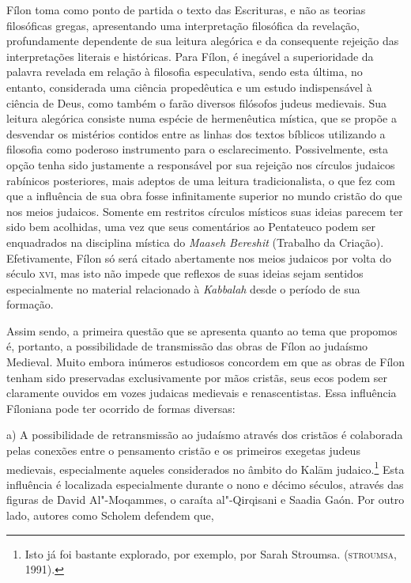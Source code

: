 Fílon toma como ponto de partida o texto das Escrituras, e não as
teorias filosóficas gregas, apresentando uma interpretação filosófica
da revelação, profundamente dependente de sua leitura alegórica e da
consequente rejeição das interpretações literais e históricas. Para
Fílon, é inegável a superioridade da palavra revelada em relação à
filosofia especulativa, sendo esta última, no entanto, considerada
uma ciência propedêutica e um estudo indispensável à ciência de Deus,
como também o farão diversos filósofos judeus medievais. Sua leitura
alegórica consiste numa espécie de hermenêutica mística, que se
propõe a desvendar os mistérios contidos entre as linhas dos textos
bíblicos utilizando a filosofia como poderoso instrumento para o
esclarecimento. Possivelmente, esta opção tenha sido justamente a
responsável por sua rejeição nos círculos judaicos rabínicos
posteriores, mais adeptos de uma leitura tradicionalista, o que fez
com que a influência de sua obra fosse infinitamente superior no
mundo cristão do que nos meios judaicos. Somente em restritos
círculos místicos suas ideias parecem ter sido bem acolhidas, uma vez
que seus comentários ao Pentateuco podem ser enquadrados na
disciplina mística do \emph{Maaseh Bereshit} (Trabalho da Criação).
Efetivamente, Fílon só será citado abertamente nos meios judaicos por
volta do século \textsc{xvi}, mas isto não impede que reflexos de suas ideias
sejam sentidos especialmente no material relacionado à
\emph{Kabbalah} desde o período de sua formação. 

Assim sendo, a primeira questão que se apresenta quanto ao tema que
propomos é, portanto, a possibilidade de transmissão das obras de
Fílon ao judaísmo Medieval. Muito embora inúmeros estudiosos
concordem em que as obras de Fílon tenham sido preservadas
exclusivamente por mãos cristãs, seus ecos podem ser claramente
ouvidos em vozes judaicas medievais e renascentistas. Essa influência
Fíloniana pode ter ocorrido de formas diversas: 

a) A possibilidade de retransmissão ao judaísmo através dos cristãos é
colaborada pelas conexões entre o pensamento cristão e os primeiros
exegetas judeus medievais, especialmente aqueles considerados no
âmbito do Kalām judaico.\footnote{ Isto já foi bastante
explorado, por exemplo, por Sarah Stroumsa. (\textsc{stroumsa}, 1991).} Esta
influência é localizada especialmente durante o nono e décimo
séculos, através das figuras de David Al"-Moqammes, o caraíta
al"-Qirqisani e Saadia Gaón. Por outro lado, autores como Scholem
defendem que,


